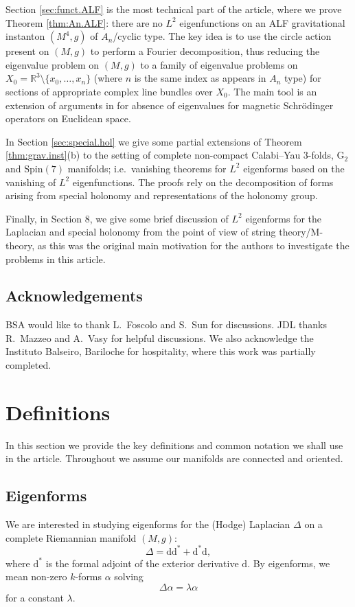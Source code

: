 \documentclass{article}
\theoremstyle{definition}
\numberwithin{thm}{section}
\numberwithin{equation}{section}
\def\R{\mathbb{R}}
\def\d{\mathrm{d}}
\begin{document}
Section \ref{sec:funct.ALF} is the most technical part of the article, where we prove Theorem \ref{thm:An.ALF}: there are no $L^2$ eigenfunctions on an ALF gravitational instanton $(M^4,g)$ of $A_{n}$/cyclic type.  The key idea is to use the circle action present on $(M,g)$ to perform a Fourier decomposition, thus reducing the eigenvalue problem on $(M,g)$ to a family of eigenvalue problems on $X_0=\R^3\setminus\{x_0,\ldots,x_n\}$ (where $n$ is the same index as appears in $A_{n}$ type) for sections of appropriate complex line bundles over $X_0$.  The main tool is an extension of arguments in \cite{AHK} for absence of eigenvalues for magnetic Schr\"odinger operators on Euclidean space.

In Section \ref{sec:special.hol} we give some partial extensions of Theorem \ref{thm:grav.inst}(b) to the setting of complete non-compact Calabi--Yau 3-folds, $\mathrm{G}_2$ and $\mathrm{Spin}(7)$ manifolds; i.e.~vanishing theorems for $L^2$ eigenforms based on the vanishing of $L^2$ eigenfunctions.  The proofs rely on the decomposition of forms arising from special holonomy and representations of the holonomy group.  

Finally, in Section 8, we give some brief discussion of $L^2$ eigenforms for the Laplacian and special holonomy from the point of view of string theory/M-theory, as this was the original main motivation for the authors to investigate the problems in this article.  

\subsection*{Acknowledgements}
BSA would like to thank L.~Foscolo and S.~Sun for discussions. JDL thanks R.~Mazzeo and A.~Vasy for helpful discussions. We also acknowledge the Instituto Balseiro, Bariloche for hospitality, where this work was partially completed.

\section{Definitions}\label{sec:dfns}

In this section we provide the key definitions and common notation we shall use in the article.  Throughout we assume our manifolds are connected and oriented.

\subsection{Eigenforms}
 We are interested in studying
eigenforms for the (Hodge) Laplacian $\Delta$ on a complete Riemannian manifold $(M,g)$:
\begin{equation}\label{eq:Delta}
    \Delta=\d\d^*+\d^*\d,
\end{equation}
where $\d^*$ is the formal adjoint of the exterior derivative $\d$.  By eigenforms, we mean non-zero $k$-forms $\alpha$ solving
\begin{equation}\label{eq:eigenform}
    \Delta\alpha=\lambda\alpha
\end{equation}
for a constant $\lambda$.  
\end{document}
